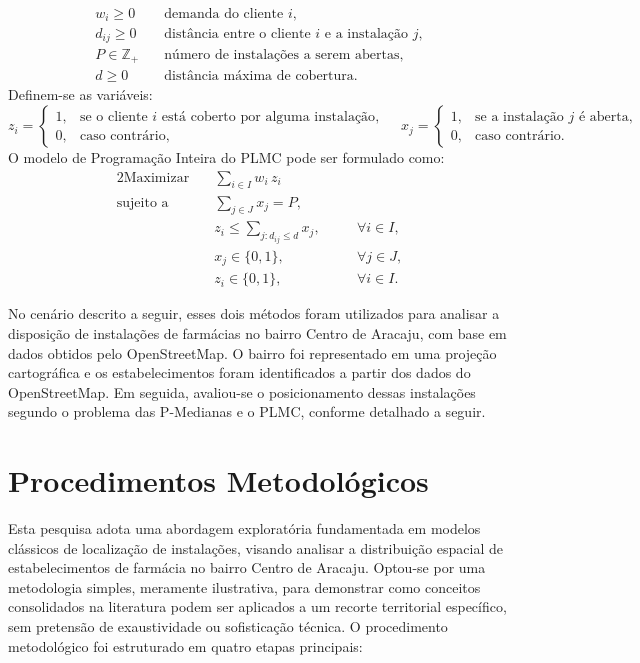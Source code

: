 \documentclass[12pt]{article}
\begin{document}
\[
\begin{aligned}
w_i \ge 0 &\quad \text{demanda do cliente } i,\\
d_{ij} \ge 0 &\quad \text{distância entre o cliente $i$ e a instalação $j$},\\
P \in \mathbb{Z}_{+} &\quad \text{número de instalações a serem abertas},\\
d \ge 0 &\quad \text{distância máxima de cobertura}.
\end{aligned}
\]
Definem-se as variáveis:
\[
z_i = 
\begin{cases}
1, & \text{se o cliente $i$ está coberto por alguma instalação}, \\
0, & \text{caso contrário},
\end{cases}
\quad
x_j =
\begin{cases}
1, & \text{se a instalação $j$ é aberta}, \\
0, & \text{caso contrário}.
\end{cases}
\]
O modelo de Programação Inteira do PLMC pode ser formulado como:
\begin{alignat*}{2}
\text{Maximizar}\quad
& \sum_{i \in I} w_i\,z_i \\
\text{sujeito a}\quad
& \sum_{j \in J} x_j = P, \\
& z_i \le \sum_{j : d_{ij} \le d} x_j, && \quad \forall i \in I, \\
& x_j \in \{0,1\}, && \quad \forall j \in J, \\
& z_i \in \{0,1\}, && \quad \forall i \in I.
\end{alignat*}

No cenário descrito a seguir, esses dois métodos foram utilizados para analisar a disposição de instalações de farmácias no bairro Centro de Aracaju, com base em dados obtidos pelo OpenStreetMap. O bairro foi representado em uma projeção cartográfica e os estabelecimentos foram identificados a partir dos dados do OpenStreetMap. Em seguida, avaliou-se o posicionamento dessas instalações segundo o problema das P-Medianas e o PLMC, conforme detalhado a seguir.

\section{Procedimentos Metodológicos}

Esta pesquisa adota uma abordagem exploratória fundamentada em modelos clássicos de localização de instalações, visando analisar a distribuição espacial de estabelecimentos de farmácia no bairro Centro de Aracaju. Optou-se por uma metodologia simples, meramente ilustrativa, para demonstrar como conceitos consolidados na literatura podem ser aplicados a um recorte territorial específico, sem pretensão de exaustividade ou sofisticação técnica. O procedimento metodológico foi estruturado em quatro etapas principais:
\end{document}
